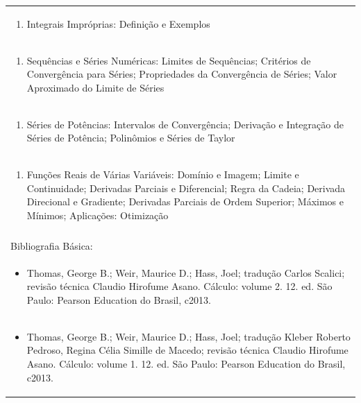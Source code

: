 \documentclass[11pt]{article}
\begin{document}
\begin{center}
\begin{longtable}{|p{4cm}|p{4cm}|p{4cm}|p{4cm}|}
\multicolumn{4}{|p{\dimexpr 16cm + 6\tabcolsep\relax}|}{\begin{enumerate}[start=2]\item Integrais Impróprias: Definição e Exemplos\end{enumerate}}\\
\multicolumn{4}{|p{\dimexpr 16cm + 6\tabcolsep\relax}|}{\begin{enumerate}[start=3]\item Sequências e Séries Numéricas: Limites de Sequências; Critérios de Convergência para Séries; Propriedades da Convergência de Séries; Valor Aproximado do Limite de Séries\end{enumerate}}\\
\multicolumn{4}{|p{\dimexpr 16cm + 6\tabcolsep\relax}|}{\begin{enumerate}[start=4]\item Séries de Potências: Intervalos de Convergência; Derivação e Integração de Séries de Potência; Polinômios e Séries de Taylor\end{enumerate}}\\
\multicolumn{4}{|p{\dimexpr 16cm + 6\tabcolsep\relax}|}{\begin{enumerate}[start=5]\item Funções Reais de Várias Variáveis: Domínio e Imagem; Limite e Continuidade; Derivadas Parciais e Diferencial; Regra da Cadeia; Derivada Direcional e Gradiente; Derivadas Parciais de Ordem Superior; Máximos e Mínimos; Aplicações: Otimização\end{enumerate}}\\
\multicolumn{4}{|p{\dimexpr 16cm + 6\tabcolsep\relax}|}{}\\
\hline
\multicolumn{4}{|p{16cm}|}{Bibliografia Básica:}\\*
\multicolumn{4}{|p{\dimexpr 16cm + 6\tabcolsep\relax}|}{\begin{itemize}\item Thomas, George B.; Weir, Maurice D.; Hass, Joel; tradução Carlos Scalici; revisão técnica Claudio Hirofume Asano. Cálculo: volume 2. 12. ed. São Paulo: Pearson Education do Brasil, c2013.\end{itemize}}\\
\multicolumn{4}{|p{\dimexpr 16cm + 6\tabcolsep\relax}|}{\begin{itemize}\item Thomas, George B.; Weir, Maurice D.; Hass, Joel; tradução Kleber Roberto Pedroso, Regina Célia Simille de Macedo; revisão técnica Claudio Hirofume Asano. Cálculo: volume 1. 12. ed. São Paulo: Pearson Education do Brasil, c2013.\end{itemize}}\\

\end{longtable}
\end{center}
\end{document}
